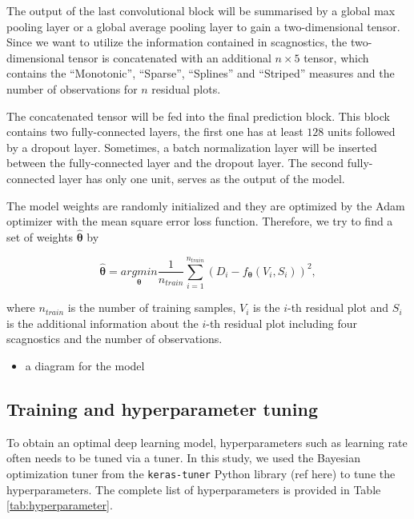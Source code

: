 \documentclass[]{interact}
\theoremstyle{plain}%
\theoremstyle{definition}
\theoremstyle{remark}
\providecommand{\tightlist}{%
  \setlength{\itemsep}{0pt}\setlength{\parskip}{0pt}}
\def\tightlist{}
\begin{document}
The output of the last convolutional block will be summarised by a
global max pooling layer or a global average pooling layer to gain a
two-dimensional tensor. Since we want to utilize the information
contained in scagnostics, the two-dimensional tensor is concatenated
with an additional \(n \times 5\) tensor, which contains the
``Monotonic'', ``Sparse'', ``Splines'' and ``Striped'' measures and the
number of observations for \(n\) residual plots.

The concatenated tensor will be fed into the final prediction block.
This block contains two fully-connected layers, the first one has at
least \(128\) units followed by a dropout layer. Sometimes, a batch
normalization layer will be inserted between the fully-connected layer
and the dropout layer. The second fully-connected layer has only one
unit, serves as the output of the model.

The model weights are randomly initialized and they are optimized by the
Adam optimizer with the mean square error loss function. Therefore, we
try to find a set of weights \(\hat{\boldsymbol{\theta}}\) by

\[\hat{\boldsymbol{\theta}} = \underset{\boldsymbol{\theta}}{argmin}\frac{1}{n_{train}}\sum_{i=1}^{n_{train}}(D_i - f_{\boldsymbol{\theta}}(V_i, S_i))^2,\]

\noindent where \(n_{train}\) is the number of training samples, \(V_i\)
is the \(i\)-th residual plot and \(S_i\) is the additional information
about the \(i\)-th residual plot including four scagnostics and the
number of observations.

\begin{itemize}
\tightlist
\item
  a diagram for the model
\end{itemize}

\hypertarget{training-and-hyperparameter-tuning}{%
\subsection{Training and hyperparameter
tuning}\label{training-and-hyperparameter-tuning}}

To obtain an optimal deep learning model, hyperparameters such as
learning rate often needs to be tuned via a tuner. In this study, we
used the Bayesian optimization tuner from the \texttt{keras-tuner}
Python library (ref here) to tune the hyperparameters. The complete list
of hyperparameters is provided in Table \ref{tab:hyperparameter}.
\end{document}
